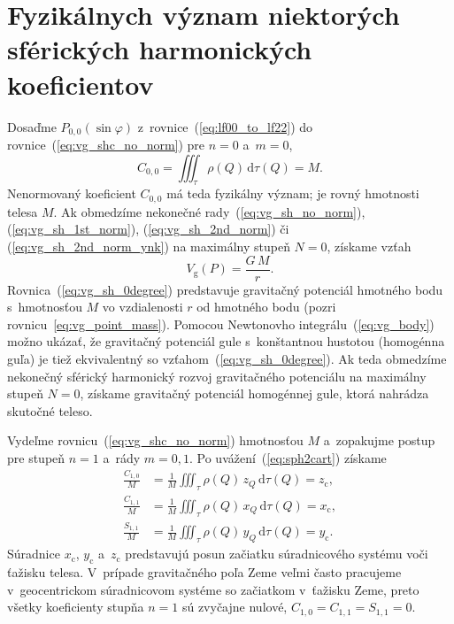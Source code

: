 \documentclass[a4paper, 12pt]{book}
\newcommand{\diff}{\mathrm d}
\newcommand{\gidx}{\mathrm g}
\begin{document}

\section{Fyzikálnych význam niektorých sférických harmonických koeficientov}
\label{sec:physical_meaning_of_spherical_harmonic_coefficients}

Dosaďme $P_{0,0}(\sin\varphi)$ z~rovnice~(\ref{eq:lf00_to_lf22})
do rovnice~(\ref{eq:vg_shc_no_norm}) pre $n = 0$ a~$m = 0$,
%
\begin{equation}
C_{0,0} = \iiint_{\tau} \rho(Q) \, \diff \tau(Q) = M{.}
\end{equation}
%
Nenormovaný koeficient $C_{0,0}$ má teda fyzikálny význam; je rovný hmotnosti 
telesa $M$.  Ak obmedzíme nekonečné rady~(\ref{eq:vg_sh_no_norm}), 
(\ref{eq:vg_sh_1st_norm}), (\ref{eq:vg_sh_2nd_norm}) či 
(\ref{eq:vg_sh_2nd_norm_ynk}) na maximálny stupeň $N = 0$, získame vzťah
%
\begin{equation}
\label{eq:vg_sh_0degree}
V_\gidx(P) = \frac{G \, M}{r}{.}
\end{equation}
%
Rovnica~(\ref{eq:vg_sh_0degree}) predstavuje gravitačný potenciál hmotného bodu 
s~hmotnosťou $M$ vo vzdialenosti $r$ od hmotného bodu (pozri 
rovnicu~\ref{eq:vg_point_mass}).  Pomocou Newtonovho 
integrálu~(\ref{eq:vg_body}) možno ukázať, že gravitačný potenciál gule 
s~konštantnou hustotou (homogénna guľa) je tiež ekvivalentný so 
vzťahom~(\ref{eq:vg_sh_0degree}).  Ak teda obmedzíme nekonečný sférický 
harmonický rozvoj gravitačného potenciálu na maximálny stupeň $N = 0$, získame 
gravitačný potenciál homogénnej gule, ktorá nahrádza skutočné teleso.

Vydeľme rovnicu~(\ref{eq:vg_shc_no_norm}) hmotnosťou $M$ a~zopakujme postup pre 
stupeň $n = 1$ a~rády $m = 0, 1$.  Po uvážení~(\ref{eq:sph2cart}) získame
%
\begin{equation}
\begin{split}
\frac{C_{1,0}}{M} &= \frac{1}{M} \iiint_{\tau} \rho(Q) \, z_Q \, \diff \tau(Q) 
= z_\mathrm{c}{,}\\
\frac{C_{1,1}}{M} &= \frac{1}{M} \iiint_{\tau} \rho(Q) \, x_Q \, \diff \tau(Q) 
= x_\mathrm{c}{,}\\
\frac{S_{1,1}}{M} &= \frac{1}{M} \iiint_{\tau} \rho(Q) \, y_Q \, \diff \tau(Q) 
= y_\mathrm{c}{.}
\end{split}
\end{equation}
%
Súradnice $x_\mathrm{c}$, $y_\mathrm{c}$ a~$z_\mathrm{c}$ predstavujú posun 
začiatku súradnicového systému voči ťažisku telesa.  V~prípade gravitačného 
poľa Zeme veľmi často pracujeme v~geocentrickom súradnicovom systéme so 
začiatkom v~ťažisku Zeme, preto všetky koeficienty stupňa $n = 1$ sú zvyčajne 
nulové, $C_{1,0} = C_{1,1} = S_{1,1} = 0$.
\end{document}
